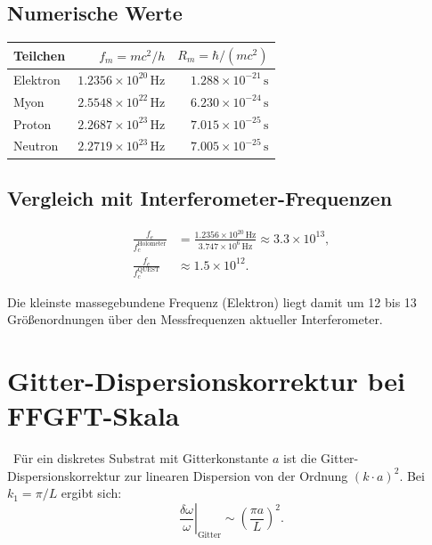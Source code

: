 \subsection{Numerische Werte}

\KM

\begin{kernbox}[title={Comptonfrequenzen stabiler Teilchen (SI)}]
\begin{center}
\begin{tabular}{lrr}
\toprule
Teilchen & $f_m = mc^2/h$ & $R_m = \hbar/(mc^2)$ \\
\midrule
Elektron  & $1.2356\times10^{20}\,\text{Hz}$ & $1.288\times10^{-21}\,\text{s}$ \\
Myon      & $2.5548\times10^{22}\,\text{Hz}$ & $6.230\times10^{-24}\,\text{s}$ \\
Proton    & $2.2687\times10^{23}\,\text{Hz}$ & $7.015\times10^{-25}\,\text{s}$ \\
Neutron   & $2.2719\times10^{23}\,\text{Hz}$ & $7.005\times10^{-25}\,\text{s}$ \\
\bottomrule
\end{tabular}
\end{center}
\end{kernbox}

\subsection{Vergleich mit Interferometer-Frequenzen}

\KM
\begin{align}
\frac{f_e}{f_c^\text{Holometer}} &= \frac{1.2356\times10^{20}\,\text{Hz}}{3.747\times10^{6}\,\text{Hz}}
\approx 3.3\times10^{13}, \\
\frac{f_e}{f_c^\text{QUEST}} &\approx 1.5\times10^{12}.
\end{align}

Die kleinste massegebundene Frequenz (Elektron) liegt damit um 12 bis 13
Größenordnungen über den Messfrequenzen aktueller Interferometer.

\section{Gitter-Dispersionskorrektur bei FFGFT-Skala}

\KM\ Für ein diskretes Substrat mit Gitterkonstante $a$ ist die
Gitter-Dispersionskorrektur zur linearen Dispersion von der Ordnung
$(k\cdot a)^2$. Bei $k_1 = \pi/L$ ergibt sich:
\begin{equation}
\left.\frac{\delta\omega}{\omega}\right|_\text{Gitter} \sim \left(\frac{\pi a}{L}\right)^2.
\end{equation}

